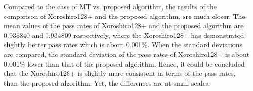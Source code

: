 Compared to the case of MT vs. proposed algorithm, the results of the comparison of Xoroshiro128+ and the proposed algorithm, are much closer. The mean values of the pass rates of Xoroshiro128+ and the proposed algorithm are $0.935840$ and $0.934809$ respectively, where the Xoroshiro128+ has demonstrated slightly better pass rates which is about 0.001\%. When the standard deviations are compared, the standard deviation of the pass rates of Xoroshiro128+ is about 0.001\% lower than that of the proposed algorithm. Hence, it could be concluded that the Xoroshiro128+ is slightly more consistent in terms of the pass rates, than the proposed algorithm. Yet, the differences are at small scales.